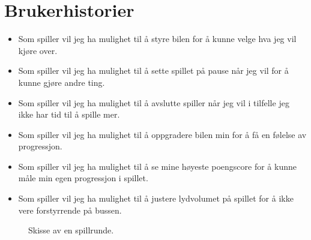 \documentclass[paper=a4]{article}
\begin{document}
	\section{Brukerhistorier}
		\begin{itemize}
			\item{Som spiller vil jeg ha mulighet til å styre bilen for å kunne velge hva jeg vil kjøre over.}
			\item{Som spiller vil jeg ha mulighet til å sette spillet på pause når jeg vil for å kunne gjøre andre ting.}
			\item{Som spiller vil jeg ha mulighet til å avslutte spiller når jeg vil i tilfelle jeg ikke har tid til å spille mer.}
			\item{Som spiller vil jeg ha mulighet til å oppgradere bilen min for å få en følelse av progressjon.}
			\item{Som spiller vil jeg ha mulighet til å se mine høyeste poengscore for å kunne måle min egen progressjon i spillet.}
			\item{Som spiller vil jeg ha mulighet til å justere lydvolumet på spillet for å ikke vere forstyrrende på bussen.}
		\end{itemize}

	\newpage
	\begin{figure}\begin{center}
		\caption{Skisse av en spillrunde.}
	\end{center}\end{figure}


\end{document}
